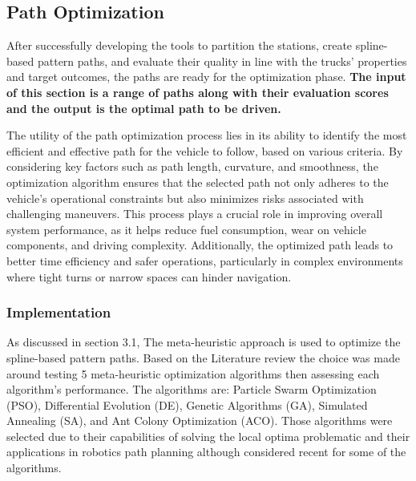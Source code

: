 \newpage
\subsection{Path Optimization}
After successfully developing the tools to partition the stations, create spline-based pattern paths, and evaluate their quality 
in line with the trucks' properties and target outcomes, the paths are ready for the optimization phase.
\textbf{The input of this section is a range of paths along with their evaluation scores and the output is the optimal 
path to be driven.}

The utility of the path optimization process lies in its ability to identify the most efficient and effective path for the 
vehicle to follow, based on various criteria. By considering key factors such as path length, curvature, and smoothness, 
the optimization algorithm ensures that the selected path not only adheres to the vehicle's operational constraints but 
also minimizes risks associated with challenging maneuvers. This process plays a crucial role in improving overall system 
performance, as it helps reduce fuel consumption, wear on vehicle components, and driving complexity. Additionally, 
the optimized path leads to better time efficiency and safer operations, particularly in complex environments where 
tight turns or narrow spaces can hinder navigation.

\subsubsection{Implementation}
As discussed in section 3.1, The meta-heuristic approach is used to optimize the spline-based pattern paths. 
Based on the Literature review the choice was made around testing 5 meta-heuristic optimization algorithms then 
assessing each algorithm's performance. The algorithms are: Particle Swarm Optimization (PSO), Differential Evolution (DE),
Genetic Algorithms (GA), Simulated Annealing (SA), and Ant Colony Optimization (ACO). Those algorithms were selected due 
to their capabilities of solving the local optima problematic and their applications in robotics path planning although 
considered recent for some of the algorithms. 

